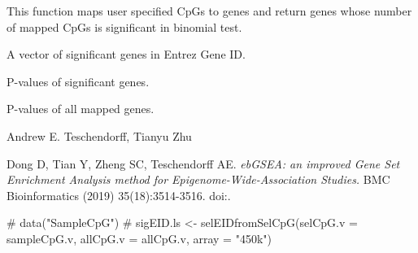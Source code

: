\documentclass[letterpaper]{book}
\begin{document}
%
\begin{Details}\relax
This function maps user specified CpGs to genes and return genes whose number of mapped CpGs is significant in binomial test.
\end{Details}
%
\begin{Value}
\begin{ldescription}
\item[\code{selEID}] A vector of significant genes in Entrez Gene ID.

\item[\code{selPV}] P-values of significant genes.

\item[\code{allPV}] P-values of all mapped genes.
\end{ldescription}
\end{Value}
%
\begin{Author}\relax
Andrew E. Teschendorff, Tianyu Zhu
\end{Author}
%
\begin{References}\relax
Dong D, Tian Y, Zheng SC, Teschendorff AE.
\emph{ebGSEA: an improved Gene Set Enrichment Analysis method for Epigenome-Wide-Association Studies.}
BMC Bioinformatics (2019) 35(18):3514-3516.
doi:.
\end{References}
%
\begin{Examples}
\begin{ExampleCode}
# data("SampleCpG")
# sigEID.ls <- selEIDfromSelCpG(selCpG.v = sampleCpG.v, allCpG.v = allCpG.v, array = "450k")

\end{ExampleCode}
\end{Examples}
\printindex{}
\end{document}

